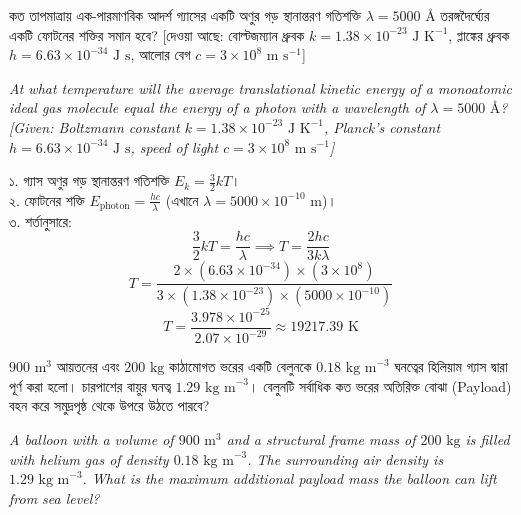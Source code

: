 \documentclass[12pt, a4paper]{article}
\begin{document}
\begin{tcolorbox}[questionbox={প্রশ্ন (Question) 7}]
\noindent
কত তাপমাত্রায় এক-পারমাণবিক আদর্শ গ্যাসের একটি অণুর গড় স্থানান্তরণ গতিশক্তি $\lambda = 5000\text{ \AA}$ তরঙ্গদৈর্ঘ্যের একটি ফোটনের শক্তির সমান হবে? [দেওয়া আছে: বোল্টজম্যান ধ্রুবক $k = 1.38 \times 10^{-23}\text{ J K}^{-1}$, প্লাঙ্কের ধ্রুবক $h = 6.63 \times 10^{-34}\text{ J s}$, আলোর বেগ $c = 3 \times 10^8\text{ m s}^{-1}$]

\vspace{0.8em}
\begin{english}
\noindent\textit{\color{darkgray}
At what temperature will the average translational kinetic energy of a monoatomic ideal gas molecule equal the energy of a photon with a wavelength of $\lambda = 5000\text{ \AA}$? [Given: Boltzmann constant $k = 1.38 \times 10^{-23}\text{ J K}^{-1}$, Planck's constant $h = 6.63 \times 10^{-34}\text{ J s}$, speed of light $c = 3 \times 10^8\text{ m s}^{-1}$]
}
\end{english}
\end{tcolorbox}

\vspace{1em}

\begin{tcolorbox}[solutionbox={সমাধান (Solution)}]
\noindent
১. গ্যাস অণুর গড় স্থানান্তরণ গতিশক্তি $E_k = \frac{3}{2} k T$। \\
২. ফোটনের শক্তি $E_{\text{photon}} = \frac{h c}{\lambda}$ (এখানে $\lambda = 5000 \times 10^{-10}\text{ m}$)। \\
৩. শর্তানুসারে:
\[ \frac{3}{2} k T = \frac{h c}{\lambda} \implies T = \frac{2 h c}{3 k \lambda} \]
\[ T = \frac{2 \times (6.63 \times 10^{-34}) \times (3 \times 10^8)}{3 \times (1.38 \times 10^{-23}) \times (5000 \times 10^{-10})} \]
\[ T = \frac{3.978 \times 10^{-25}}{2.07 \times 10^{-29}} \approx 19217.39\text{ K} \]
\end{tcolorbox}

\begin{tcolorbox}[questionbox={প্রশ্ন (Question) 8}]
\noindent
$900\text{ m}^3$ আয়তনের এবং $200\text{ kg}$ কাঠামোগত ভরের একটি বেলুনকে $0.18\text{ kg m}^{-3}$ ঘনত্বের হিলিয়াম গ্যাস দ্বারা পূর্ণ করা হলো। চারপাশের বায়ুর ঘনত্ব $1.29\text{ kg m}^{-3}$। বেলুনটি সর্বাধিক কত ভরের অতিরিক্ত বোঝা (Payload) বহন করে সমুদ্রপৃষ্ঠ থেকে উপরে উঠতে পারবে?

\vspace{0.8em}
\begin{english}
\noindent\textit{\color{darkgray}
A balloon with a volume of $900\text{ m}^3$ and a structural frame mass of $200\text{ kg}$ is filled with helium gas of density $0.18\text{ kg m}^{-3}$. The surrounding air density is $1.29\text{ kg m}^{-3}$. What is the maximum additional payload mass the balloon can lift from sea level?
}
\end{english}
\end{tcolorbox}
\end{document}

